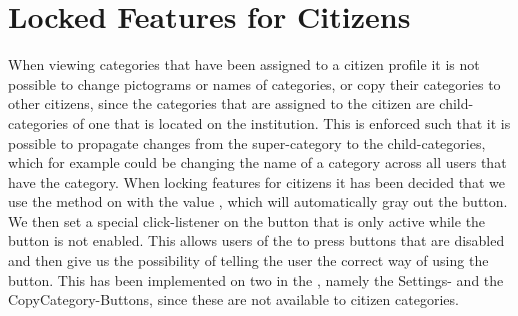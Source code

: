 
\section{Locked Features for Citizens}
\label{sec:locked_features_for_citizens}

When viewing categories that have been assigned to a citizen profile it is not possible to change pictograms or names of categories, or copy their categories to other citizens, since the categories that are assigned to the citizen are child-categories of one that is located on the institution. This is enforced such that it is possible to propagate changes from the super-category to the child-categories, which for example could be changing the name of a category across all users that have the category. When locking features for citizens it has been decided that we use the  method on  with the value , which will automatically gray out the button. We then set a special click-listener on the button that is only active while the button is not enabled. This allows users of the \ct to press buttons that are disabled and then give us the possibility of telling the user the correct way of using the button. This has been implemented on two  in the \ct, namely the Settings- and the CopyCategory-Buttons, since these are not available to citizen categories. 

